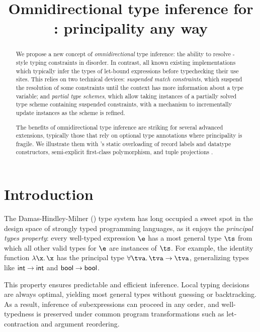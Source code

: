 \documentclass[acmsmall,screen,nonacm,review]{acmart}
\title{Omnidirectional type inference for \ML: principality any way}
\begin{document}
\begin{abstract}

We propose a new concept of \emph{omnidirectional} type inference: the
ability to resolve \ML-style typing constraints in disorder. In contrast,
all known existing implementations which typically infer the types of
let-bound expressions before typechecking their use sites.
%
This relies on two technical devices: \emph{suspended match constraints}, which
suspend the resolution of some constraints until the context has more
information about a type variable; and \emph{partial type schemes}, which allow
taking instances of a partially solved type scheme containing suspended constraints, with a
mechanism to incrementally update instances as the scheme is refined.

The benefits of omnidirectional type inference are striking for several
advanced \ML extensions, typically those that rely on optional type
annotations where principality is fragile. We illustrate them with \OCaml's
static overloading of record labels and datatype constructors, semi-explicit
first-class polymorphism, and tuple projections \ala \SML.
\end{abstract}
\maketitle

\section{Introduction}
\label{sec/introduction}


The Damas-Hindley-Milner (\HM) \cite{Damas-Milner/W@popl82} type system has
long occupied a sweet spot in the design space of strongly typed programming
languages, as it enjoys the \emph{principal types property}: every well-typed
expression $\e$ has a most general type $\ts$ from which all other valid
types for $\e$ are instances of $\ts$. For example, the identity function
$\efun \x \x$ has the principal type $\tfor \tv \tv \to \tv$, generalizing
types like $\mathsf{int} \to \mathsf{int}$ and $\mathsf{bool} \to \mathsf{bool}$.


This property ensures predictable and efficient inference. Local typing
decisions are always optimal, yielding most general types without guessing or
backtracking. As a result, inference of subexpressions can proceed in any
order, and well-typedness is preserved under common program transformations
such as let-contraction and argument reordering.
\end{document}

